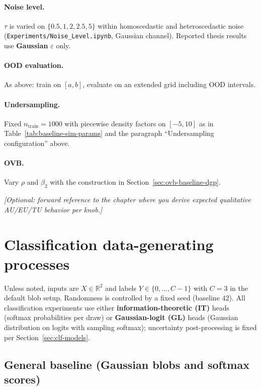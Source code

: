 \paragraph{Noise level.}
$\tau$ is varied on $\{0.5,1,2,2.5,5\}$ within homoscedastic and heteroscedastic noise (\texttt{Experiments/Noise\_Level.ipynb}, Gaussian channel). Reported thesis results use \textbf{Gaussian} $\varepsilon$ only.

\paragraph{OOD evaluation.}
As above: train on $[a,b]$, evaluate on an extended grid including OOD intervals.

\paragraph{Undersampling.}
Fixed $n_{\mathrm{train}}=1000$ with piecewise density factors on $[-5,10]$ as in Table~\ref{tab:baseline-sim-params} and the paragraph ``Undersampling configuration'' above.

\paragraph{OVB.}
Vary $\rho$ and $\beta_2$ with the construction in Section~\ref{sec:ovb-baseline-dgp}.

\textit{[Optional: forward reference to the chapter where you derive expected qualitative AU/EU/TU behavior per knob.]}

\section{Classification data-generating processes}
\label{sec:classification-dgp}

Unless noted, inputs are $X\in\mathbb{R}^2$ and labels $Y\in\{0,\ldots,C-1\}$ with $C=3$ in the default blob setup. Randomness is controlled by a fixed seed (baseline $42$). All classification experiments use either \textbf{information-theoretic (IT)} heads (softmax probabilities per draw) or \textbf{Gaussian-logit (GL)} heads (Gaussian distribution on logits with sampling softmax); uncertainty post-processing is fixed per Section~\ref{sec:clf-models}.

\subsection{General baseline (Gaussian blobs and softmax scores)}
\label{sec:clf-baseline-blobs}

